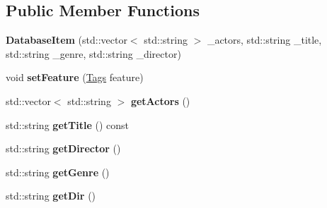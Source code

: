 \subsection*{Public Member Functions}
\begin{DoxyCompactItemize}
\item 
\mbox{\label{classDatabaseItem_abb8e57f5ec53e855c541e5b27c4dfe10}} 
{\bfseries Database\+Item} (std\+::vector$<$ std\+::string $>$ \+\_\+actors, std\+::string \+\_\+title, std\+::string \+\_\+genre, std\+::string \+\_\+director)
\item 
\mbox{\label{classDatabaseItem_a51f4dbeb282806b7ac10e6b49b90eeef}} 
void {\bfseries set\+Feature} (\hyperlink{structTags}{Tags} feature)
\item 
\mbox{\label{classDatabaseItem_a98560961c4ab1266fe9b10f094bea568}} 
std\+::vector$<$ std\+::string $>$ {\bfseries get\+Actors} ()
\item 
\mbox{\label{classDatabaseItem_a87f2ebf677aaec4bc2e95eea2b7bd329}} 
std\+::string {\bfseries get\+Title} () const
\item 
\mbox{\label{classDatabaseItem_a7edc61bf54ac2e48e921b9948d9efecb}} 
std\+::string {\bfseries get\+Director} ()
\item 
\mbox{\label{classDatabaseItem_ac1d9f64c889ed271aa0f586a62a2c82a}} 
std\+::string {\bfseries get\+Genre} ()
\item 
\mbox{\label{classDatabaseItem_afcca0a554ac65bdcf796480e8d2920f4}} 
std\+::string {\bfseries get\+Dir} ()
\end{DoxyCompactItemize}
